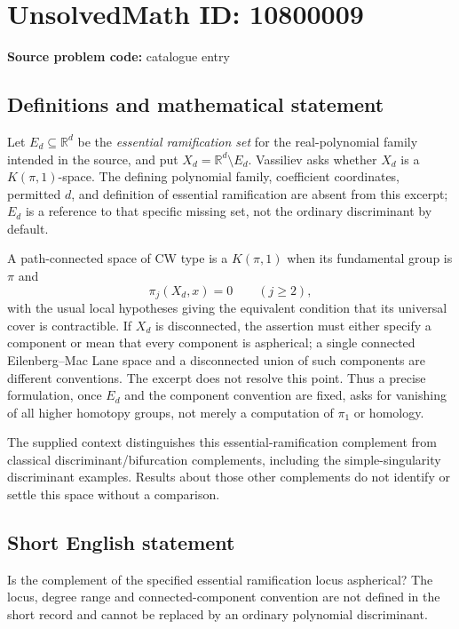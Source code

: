 \documentclass[11pt]{article}
\newcommand{\R}{\mathbb{R}}
\begin{document}
\section*{UnsolvedMath ID: 10800009}
\textbf{Source problem code:} catalogue entry
\subsection{Definitions and mathematical statement}
Let \(E_d\subseteq\R^d\) be the \emph{essential ramification set} for the real-polynomial family intended in the source, and put \(X_d=\R^d\setminus E_d\). Vassiliev asks whether \(X_d\) is a \(K(\pi,1)\)-space. The defining polynomial family, coefficient coordinates, permitted \(d\), and definition of essential ramification are absent from this excerpt; \(E_d\) is a reference to that specific missing set, not the ordinary discriminant by default.

A path-connected space of CW type is a \(K(\pi,1)\) when its fundamental group is \(\pi\) and
\[\pi_j(X_d,x)=0\qquad(j\geq2),\]
with the usual local hypotheses giving the equivalent condition that its universal cover is contractible. If \(X_d\) is disconnected, the assertion must either specify a component or mean that every component is aspherical; a single connected Eilenberg--Mac Lane space and a disconnected union of such components are different conventions. The excerpt does not resolve this point. Thus a precise formulation, once \(E_d\) and the component convention are fixed, asks for vanishing of all higher homotopy groups, not merely a computation of \(\pi_1\) or homology.

The supplied context distinguishes this essential-ramification complement from classical discriminant/bifurcation complements, including the simple-singularity discriminant examples. Results about those other complements do not identify or settle this space without a comparison.
\subsection{Short English statement}
Is the complement of the specified essential ramification locus aspherical? The locus, degree range and connected-component convention are not defined in the short record and cannot be replaced by an ordinary polynomial discriminant.
\end{document}
